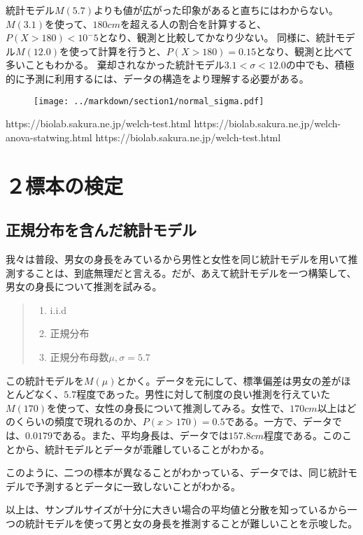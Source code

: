 \documentclass[a4paper,11pt,dvipdfmx]{jsarticle}
\begin{document}
統計モデル$M(5.7)$よりも値が広がった印象があると直ちにはわからない。
$M(3.1)$を使って、$180cm$を超える人の割合を計算すると、$P(X>180)<10^-5$となり、観測と比較してかなり少ない。
同様に、統計モデル$M(12.0)$を使って計算を行うと、$P(X>180)=0.15$となり、観測と比べて多いこともわかる。
棄却されなかった統計モデル$3.1<\sigma<12.0$の中でも、積極的に予測に利用するには、データの構造をより理解する必要がある。


\begin{figure}
\begin{center}
    \texttt{[image: ../markdown/section1/normal\_sigma.pdf]}
\end{center}
\end{figure}

https://biolab.sakura.ne.jp/welch-test.html
https://biolab.sakura.ne.jp/welch-anova-statwing.html
https://biolab.sakura.ne.jp/welch-test.html
\fi

\clearpage
\section{２標本の検定}
\subsection{正規分布を含んだ統計モデル}
我々は普段、男女の身長をみているから男性と女性を同じ統計モデルを用いて推測することは、到底無理だと言える。だが、あえて統計モデルを一つ構築して、男女の身長について推測を試みる。
\begin{quote}
    \begin{enumerate}[(1)]
\item i.i.d
\item 正規分布
\item 正規分布母数$\mu,\sigma=5.7$
\end{enumerate}
\end{quote}
この統計モデルを$M(\mu)$とかく。データを元にして、標準偏差は男女の差がほとんどなく、$5.7$程度であった。男性に対して制度の良い推測を行えていた$M(170)$を使って、女性の身長について推測してみる。女性で、$170cm$以上はどのくらいの頻度で現れるのか、$P(x>170)=0.5$である。一方で、データでは、$0.0179$である。また、平均身長は、データでは$157.8cm$程度である。このことから、統計モデルとデータが乖離していることがわかる。


このように、二つの標本が異なることがわかっている、データでは、同じ統計モデルで予測するとデータに一致しないことがわかる。
\fi


以上は、サンプルサイズが十分に大きい場合の平均値と分散を知っているから一つの統計モデルを使って男と女の身長を推測することが難しいことを示唆した。
\end{document}
